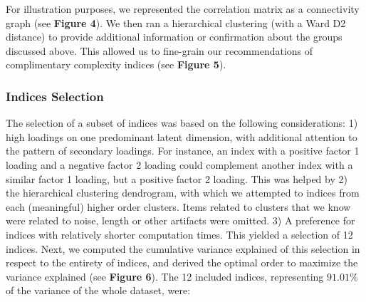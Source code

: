 \documentclass[
  man]{apa6}
\begin{document}
For illustration purposes, we represented the correlation matrix as a connectivity graph (see \textbf{Figure 4}). We then ran a hierarchical clustering (with a Ward D2 distance) to provide additional information or confirmation about the groups discussed above. This allowed us to fine-grain our recommendations of complimentary complexity indices (see \textbf{Figure 5}).

\hypertarget{indices-selection}{%
\subsubsection{Indices Selection}\label{indices-selection}}

The selection of a subset of indices was based on the following considerations: 1) high loadings on one predominant latent dimension, with additional attention to the pattern of secondary loadings. For instance, an index with a positive factor 1 loading and a negative factor 2 loading could complement another index with a similar factor 1 loading, but a positive factor 2 loading. This was helped by 2) the hierarchical clustering dendrogram, with which we attempted to indices from each (meaningful) higher order clusters. Items related to clusters that we know were related to noise, length or other artifacts were omitted. 3) A preference for indices with relatively shorter computation times. This yielded a selection of 12 indices. Next, we computed the cumulative variance explained of this selection in respect to the entirety of indices, and derived the optimal order to maximize the variance explained (see \textbf{Figure 6}). The 12 included indices, representing \(91.01\%\) of the variance of the whole dataset, were:
\end{document}
